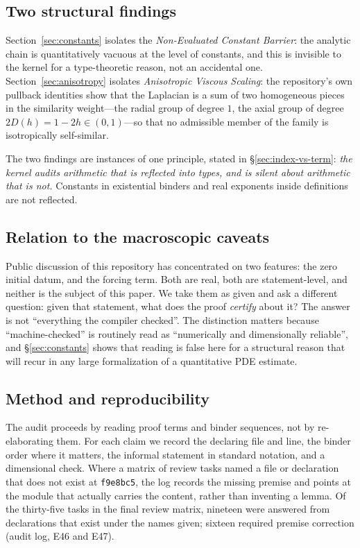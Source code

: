 \documentclass[11pt]{article}
\theoremstyle{plain}
\theoremstyle{definition}
\theoremstyle{remark}
\begin{document}
\subsection{Two structural findings}

Section~\ref{sec:constants} isolates the \emph{Non-Evaluated Constant Barrier}:
the analytic chain is quantitatively vacuous at the level of constants, and
this is invisible to the kernel for a type-theoretic reason, not an accidental
one. Section~\ref{sec:anisotropy} isolates \emph{Anisotropic Viscous Scaling}:
the repository's own pullback identities show that the Laplacian is a sum of
two homogeneous pieces in the similarity weight---the radial group of degree
$1$, the axial group of degree $2D(h)=1-2h\in(0,1)$---so that no
admissible member of the family is isotropically self-similar.

The two findings are instances of one principle, stated in
\S\ref{sec:index-vs-term}: \emph{the kernel audits arithmetic that is reflected
into types, and is silent about arithmetic that is not.} Constants in
existential binders and real exponents inside definitions are not reflected.

\subsection{Relation to the macroscopic caveats}

Public discussion of this repository has concentrated on two features: the zero
initial datum, and the forcing term. Both are real, both are statement-level,
and neither is the subject of this paper. We take them as given and ask a
different question: given that statement, what does the proof \emph{certify}
about it? The answer is not ``everything the compiler checked''. The
distinction matters because ``machine-checked'' is routinely read as
``numerically and dimensionally reliable'', and \S\ref{sec:constants} shows that
reading is false here for a structural reason that will recur in any large
formalization of a quantitative PDE estimate.

\subsection{Method and reproducibility}
\label{sec:method}

The audit proceeds by reading proof terms and binder sequences, not by
re-elaborating them. For each claim we record the declaring file and line, the
binder order where it matters, the informal statement in standard notation, and
a dimensional check. Where a matrix of review tasks named a file or declaration
that does not exist at \texttt{f9e8bc5}, the log records the missing premise and
points at the module that actually carries the content, rather than inventing a
lemma. Of the thirty-five tasks in the final review matrix, nineteen were
answered from declarations that exist under the names given; sixteen required
premise correction (audit log, E46 and E47).
\end{document}
